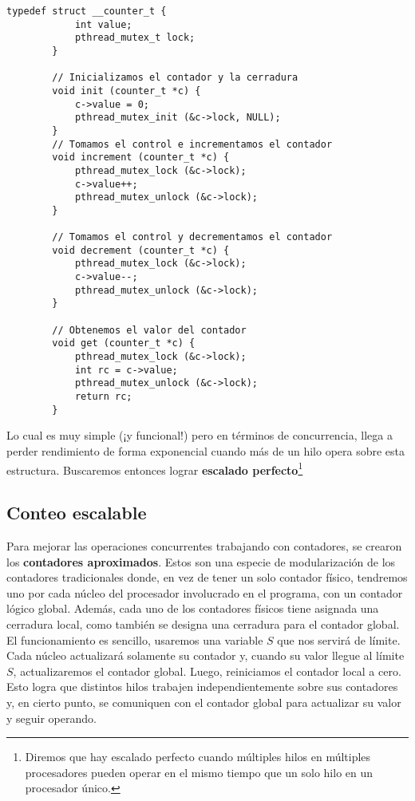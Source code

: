 \documentclass{article}
\begin{document}
	\begin{lstlisting}[caption=Implementación de un contador básico]
		typedef struct __counter_t {
			int value;
			pthread_mutex_t lock;
		}
	
		// Inicializamos el contador y la cerradura
		void init (counter_t *c) {
			c->value = 0;
			pthread_mutex_init (&c->lock, NULL);
		}
		// Tomamos el control e incrementamos el contador
		void increment (counter_t *c) {
			pthread_mutex_lock (&c->lock);
			c->value++;
			pthread_mutex_unlock (&c->lock);
		}

		// Tomamos el control y decrementamos el contador
		void decrement (counter_t *c) {
			pthread_mutex_lock (&c->lock);
			c->value--;
			pthread_mutex_unlock (&c->lock);
		}

		// Obtenemos el valor del contador
		void get (counter_t *c) {
			pthread_mutex_lock (&c->lock);
			int rc = c->value;
			pthread_mutex_unlock (&c->lock);
			return rc;
		}
	\end{lstlisting}
	Lo cual es muy simple (¡y funcional!) pero en términos de concurrencia, llega a perder rendimiento de forma exponencial cuando más de un hilo opera sobre esta estructura. Buscaremos entonces lograr \textbf{escalado perfecto}\footnote{Diremos que hay escalado perfecto cuando múltiples hilos en múltiples procesadores pueden operar en el mismo tiempo que un solo hilo en un procesador único.}
	
	\subsection{Conteo escalable}
	Para mejorar las operaciones concurrentes trabajando con contadores, se crearon los \textbf{contadores aproximados}. Estos son una especie de modularización de los contadores tradicionales donde, en vez de tener un solo contador físico, tendremos uno por cada núcleo del procesador involucrado en el programa, con un contador lógico global. Además, cada uno de los contadores físicos tiene asignada una cerradura local, como también se designa una cerradura para el contador global. El funcionamiento es sencillo, usaremos una variable $S$ que nos servirá de límite. Cada núcleo actualizará solamente su contador y, cuando su valor llegue al límite $S$, actualizaremos el contador global. Luego, reiniciamos el contador local a cero. Esto logra que distintos hilos trabajen independientemente sobre sus contadores y, en cierto punto, se comuniquen con el contador global para actualizar su valor y seguir operando.
	
\end{document}
